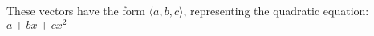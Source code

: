 \documentclass[preview]{standalone}
\begin{document}
\begin{center}
These vectors have the form $\langle a, b, c\rangle$, representing the quadratic equation: $a+bx+cx^2$
\end{center}
\end{document}
